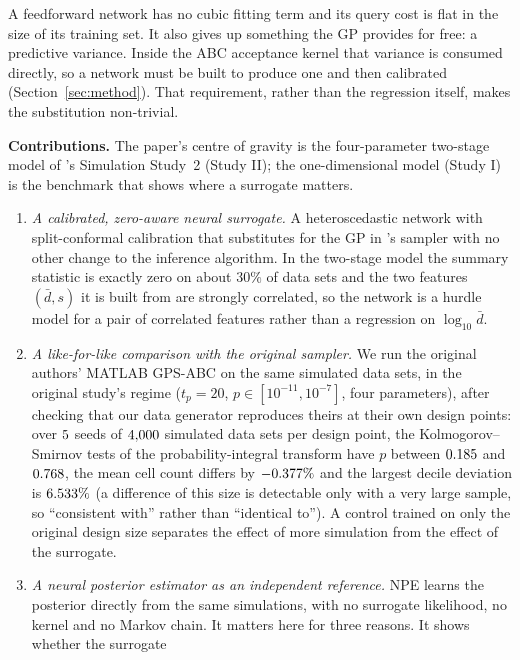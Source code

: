 \documentclass[sn-basic,iicol,pdflatex]{sn-jnl}
\begin{document}
A feedforward network has no cubic fitting term and its query cost is flat in
the size of its training set. It also gives up something the GP provides for
free: a predictive variance. Inside the ABC acceptance kernel that variance is
consumed directly, so a network must be built to produce one and then calibrated
(Section~\ref{sec:method}). That requirement, rather than the regression
itself, makes the substitution non-trivial.

\noindent\textbf{Contributions.} The paper's centre of gravity is the four-parameter
two-stage model of \citeauthor{lu2023}'s Simulation Study~2 (Study II); the
one-dimensional model (Study I) is the benchmark that shows where a surrogate
matters.
\begin{enumerate}[label=(\roman*),leftmargin=*,itemsep=2pt,topsep=2pt]
\item \emph{A calibrated, zero-aware neural surrogate.} A heteroscedastic network
with split-conformal calibration \citep{lei2018} that substitutes for the GP in
\citeauthor{lu2023}'s sampler with no other change to the inference algorithm. In
the two-stage model the summary statistic is exactly zero on about $30\%$ of data
sets and the two features $(\bar d,s)$ it is built from are strongly correlated, so
the network is a hurdle model for a pair of correlated features rather than a
regression on $\log_{10}\bar d$.
\item \emph{A like-for-like comparison with the original sampler.} We run the
original authors' MATLAB GPS-ABC on the same simulated data sets, in the original
study's regime ($t_p=20$, $p\in[10^{-11},10^{-7}]$, four parameters), after checking
that our data generator reproduces theirs at their own design points: over $5$ seeds of $4{,}000$ simulated data sets per design point, the
Kolmogorov--Smirnov tests of the probability-integral transform have $p$ between $0.185$ and $0.768$, the mean cell count differs by $-0.377\%$ and the
largest decile deviation is $6.533\%$ (a difference of this size is detectable only with a very large sample, so ``consistent with'' rather than ``identical to''). A control trained on only the original design size separates the effect
of more simulation from the effect of the surrogate.
\item \emph{A neural posterior estimator as an independent reference.} NPE learns the
posterior directly from the same simulations, with no surrogate likelihood, no kernel
and no Markov chain. It matters here for three reasons. It shows whether the surrogate

\end{enumerate}
\end{document}
